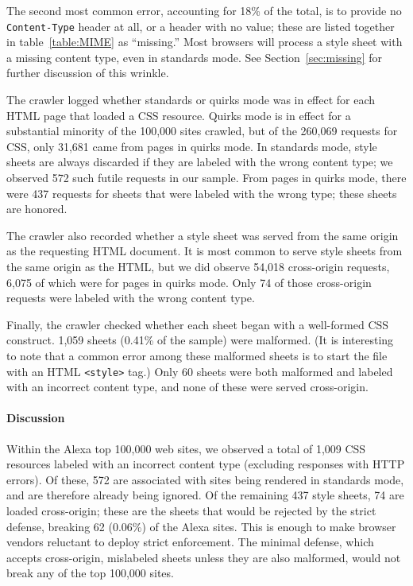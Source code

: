 \documentclass{acm_proc_article-sp}
\begin{document}
The second most common error, accounting for 18\% of the total, is to
provide no \texttt{Content-Type} header at all, or a header with no
value; these are listed together in table~\ref{table:MIME} as
“missing.”  Most browsers will process a style sheet with a missing
content type, even in standards mode.  See
Section~\ref{sec:missing} for further discussion of this wrinkle.

The crawler logged whether standards or quirks mode was in effect for
each HTML page that loaded a CSS resource.  Quirks mode is in effect
for a substantial minority of the 100,000 sites crawled, but of the
260,069 requests for CSS, only 31,681 came from pages in quirks mode.
In standards mode, style sheets are always discarded if they are
labeled with the wrong content type; we observed 572 such futile
requests in our sample.  From pages in quirks mode, there were 437
requests for sheets that were labeled with the wrong type; these
sheets are honored.

The crawler also recorded whether a style sheet was served from the
same origin as the requesting HTML document.  It is most common to
serve style sheets from the same origin as the HTML, but we did
observe 54,018 cross-origin requests, 6,075 of which were for pages in
quirks mode.  Only 74 of those cross-origin requests were labeled with
the wrong content type.

Finally, the crawler checked whether each sheet began with a
well-formed CSS construct.  1,059 sheets (0.41\% of the sample) were
malformed.  (It is interesting to note that a common error among these
malformed sheets is to start the file with an HTML \verb|<style>|
tag.)  Only 60 sheets were both malformed and labeled with an
incorrect content type, and none of these were served cross-origin.

\paragraph{Discussion}
Within the Alexa top 100,000 web sites, we observed a total of 1,009
CSS resources labeled with an incorrect content type (excluding responses
with HTTP errors).  Of these, 572 are associated with sites being
rendered in standards mode, and are therefore already being ignored.
Of the remaining 437 style sheets, 74 are loaded cross-origin; these
are the sheets that would be rejected by the strict defense, breaking
62 (0.06\%) of the Alexa sites.  This is enough to make browser
vendors reluctant to deploy strict enforcement.  The minimal defense,
which accepts cross-origin, mislabeled sheets unless they are also
malformed, would not break any of the top 100,000 sites.
\end{document}
